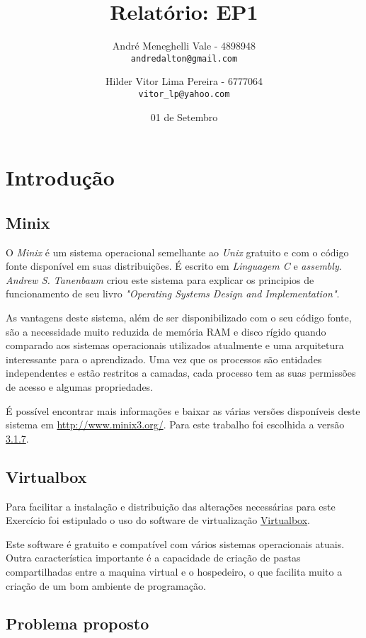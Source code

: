 \documentclass[12pt,a4paper]{article}
\author{
    André Meneghelli Vale - 4898948\\
    \texttt{andredalton@gmail.com}
    \and
    Hilder Vitor Lima Pereira - 6777064\\
    \texttt{vitor\_lp@yahoo.com}
}
\date{01 de Setembro} %
\title{Relatório: EP1}
\begin{document}
\maketitle

\section{Introdução}

\subsection{Minix}

   O \emph{Minix} é um sistema operacional semelhante ao \emph{Unix} gratuito e com o código fonte disponível em suas distribuições. É escrito em \emph{Linguagem C} e \emph{assembly}. \emph{Andrew S. Tanenbaum} criou este sistema para explicar os principios de funcionamento de seu livro \emph{"Operating Systems Design and Implementation"}.

   As vantagens deste sistema, além de ser disponibilizado com o seu código fonte, são a necessidade muito reduzida de memória RAM e disco rígido quando comparado aos sistemas operacionais utilizados atualmente e uma arquitetura interessante para o aprendizado. Uma vez que os processos são entidades independentes e estão restritos a camadas, cada processo tem as suas permissões de acesso e algumas propriedades.

   É possível encontrar mais informações e baixar as várias versões disponíveis deste sistema em \url{http://www.minix3.org/}. Para este trabalho foi escolhida a versão \href{http://www.minix3.org/iso/minix_R3.1.7-r7256.iso.gz}{3.1.7}.

\subsection{Virtualbox}

   Para facilitar a instalação e distribuição das alterações necessárias para este Exercício foi estipulado o uso do software de virtualização \href{https://www.virtualbox.org/}{Virtualbox}.

   Este software é gratuito e compatível com vários sistemas operacionais atuais. Outra característica importante é a capacidade de criação de pastas compartilhadas entre a maquina virtual e o hospedeiro, o que facilita muito a criação de um bom ambiente de programação.

\subsection{Problema proposto}
\end{document}
